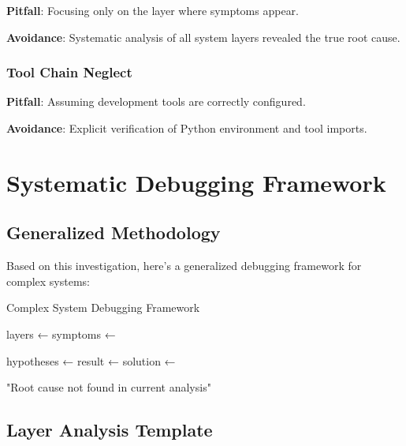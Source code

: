 \documentclass[11pt,a4paper]{article}
\begin{document}
\textbf{Pitfall}: Focusing only on the layer where symptoms appear.

\textbf{Avoidance}: Systematic analysis of all system layers revealed the true root cause.

\subsubsection{Tool Chain Neglect}

\textbf{Pitfall}: Assuming development tools are correctly configured.

\textbf{Avoidance}: Explicit verification of Python environment and tool imports.

\section{Systematic Debugging Framework}

\subsection{Generalized Methodology}

Based on this investigation, here's a generalized debugging framework for complex systems:

\begin{algorithm}
\caption{Complex System Debugging Framework}
\begin{algorithmic}[1]
    \State layers ← 
    \State symptoms ← 
    
        \State hypotheses ← 
            \State result ← 
                \State solution ← 
                \State \Return {}
            \EndIf
        \EndFor
    \EndFor
    
    \State \Return "Root cause not found in current analysis"
\EndProcedure
\end{algorithmic}
\end{algorithm}

\subsection{Layer Analysis Template}
\end{document}
